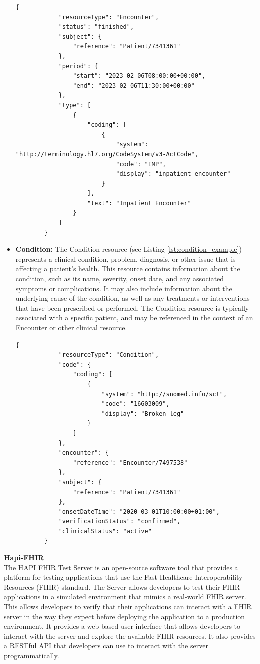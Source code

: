 \documentclass[]{report}
\begin{document}
\begin{itemize}
\begin{lstlisting}[style=json, label=lst:encounter_example, caption={Example for a FHIR encounter ressource}]
        {
            "resourceType": "Encounter",
            "status": "finished",
            "subject": {
                "reference": "Patient/7341361"
            },
            "period": {
                "start": "2023-02-06T08:00:00+00:00",
                "end": "2023-02-06T11:30:00+00:00"
            },
            "type": [
                {
                    "coding": [
                        {
                            "system": "http://terminology.hl7.org/CodeSystem/v3-ActCode",
                            "code": "IMP",
                            "display": "inpatient encounter"
                        }
                    ],
                    "text": "Inpatient Encounter"
                }
            ]
        }
    \end{lstlisting}
    \item \textbf{Condition:} The Condition resource (see Listing \ref{lst:condition_example}) represents a clinical condition, problem, diagnosis, or other issue that is affecting a patient's health. This resource contains information about the condition, such as its name, severity, onset date, and any associated symptoms or complications. It may also include information about the underlying cause of the condition, as well as any treatments or interventions that have been prescribed or performed. The Condition resource is typically associated with a specific patient, and may be referenced in the context of an Encounter or other clinical resource.\begin{lstlisting}[style=json, label=lst:condition_example, caption={Example for a FHIR condition ressource}]
        {
            "resourceType": "Condition",
            "code": {
                "coding": [
                    {
                        "system": "http://snomed.info/sct",
                        "code": "16603009",
                        "display": "Broken leg"
                    }
                ]
            },
            "encounter": {
                "reference": "Encounter/7497538"
            },
            "subject": {
                "reference": "Patient/7341361"
            },
            "onsetDateTime": "2020-03-01T10:00:00+01:00",
            "verificationStatus": "confirmed",
            "clinicalStatus": "active"
        }    
    \end{lstlisting}
\end{itemize}
\textbf{Hapi-FHIR}\\
The HAPI FHIR Test Server is an open-source software tool that provides a platform for testing applications that use the Fast Healthcare Interoperability Resources (FHIR) standard. The Server allows developers to test their FHIR applications in a simulated environment that mimics a real-world FHIR server. This allows developers to verify that their applications can interact with a FHIR server in the way they expect before deploying the application to a production environment. It provides a web-based user interface that allows developers to interact with the server and explore the available FHIR resources. It also provides a RESTful API that developers can use to interact with the server programmatically.
\end{document}
